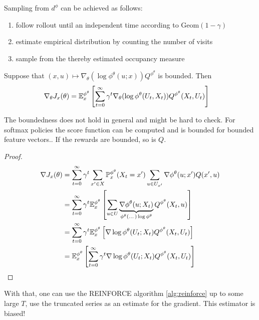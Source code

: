 Sampling from \(d^\phi\) can be achieved as follows:
\begin{enumerate}
    \item follow rollout until an independent time according to Geom\((1-\gamma)\)
    \item estimate empirical distribution by counting the number of visits 
    \item sample from the thereby estimated occupancy measure
\end{enumerate}

\begin{theorem}\label{thm:57}
    Suppose that \((x,u)\mapsto \nabla_\theta\left(\log\phi^\theta(u;x)\right)Q^{\phi^\theta}\) is bounded.
    Then 
    \begin{align*}
        \nabla_\theta J_x(\theta)&=\mathbb{E}_x^{\phi^\theta}\left[\sum_{t=0}^{\infty}\gamma^t\nabla_\theta(\log \phi^\theta(U_t,X_t))Q^{\phi^\theta}(X_t,U_t)\right]
    \end{align*}
\end{theorem}

The boundedness does not hold in general and might be hard to check. For softmax policies 
the score function can be computed and is bounded for bounded feature vectors.. If the rewards are bounded, so is \(Q\).

\begin{proof}
    \begin{align*}
        \nabla J_x(\theta) &= \sum_{t=0}^{\infty}\gamma^t\sum_{x'\in X}\mathbb{P}_x^{\phi^\theta}(X_t=x')\sum_{u\in U_{x'}}\nabla\phi^\theta(u;x')Q(x',u)\\
        &=\sum_{t=0}^\infty \gamma^t\mathbb{E}_x^{\phi^\theta}\left[\sum_{u\in U}\underbrace{\nabla\phi^\theta(u;X_t)}_{\phi^\theta(\dots)\log \phi^\theta}Q^{\phi^\theta}(X_t,u)\right]\\
        &=\sum_{t=0}^\infty \gamma^t\mathbb{E}_x^{\phi^\theta}\left[\nabla \log \phi^\theta(U_t;X_t)Q^{\phi^\theta}(X_t,U_t)\right]\\
        &=\mathbb{E}_x^{\phi^\theta}\left[\sum_{t=0}^{\infty}\gamma^t\nabla \log \phi^\theta(U_t;X_t)Q^{\phi^\theta}(X_t,U_t)\right]
    \end{align*}
\end{proof}

With that, one can use the REINFORCE algorithm \ref{alg:reinforce} up to some large \(T\),
use the truncated series as an estimate for the gradient. This estimator is biased!

